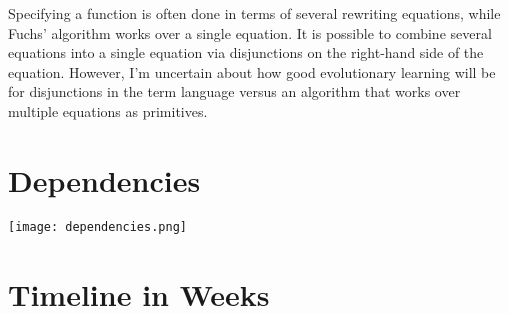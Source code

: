 \documentclass{article}
\begin{document}
Specifying a function is often done in terms of several rewriting
equations, while Fuchs' algorithm works over a single equation. It is
possible to combine several equations into a single equation via
disjunctions on the right-hand side of the equation. However, I'm
uncertain about how good evolutionary learning will be for disjunctions
in the term language versus an algorithm that works over multiple
equations as primitives.

\section{Dependencies}

\texttt{[image: dependencies.png]}

\section{Timeline in Weeks}
\end{document}
